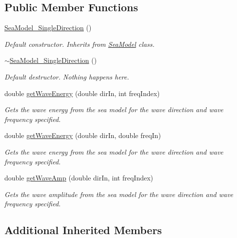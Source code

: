 \subsection*{Public Member Functions}
\begin{DoxyCompactItemize}
\item 
\hyperlink{classosea_1_1_sea_model___single_direction_a6af167a4b5c05a0d1764e3172977c5fa}{Sea\-Model\-\_\-\-Single\-Direction} ()
\begin{DoxyCompactList}\small\item\em Default constructor. Inherits from \hyperlink{classosea_1_1_sea_model}{Sea\-Model} class. \end{DoxyCompactList}\item 
\hyperlink{classosea_1_1_sea_model___single_direction_a3c360d846888f7f964cee4fb66875eaa}{$\sim$\-Sea\-Model\-\_\-\-Single\-Direction} ()
\begin{DoxyCompactList}\small\item\em Default destructor. Nothing happens here. \end{DoxyCompactList}\item 
double \hyperlink{classosea_1_1_sea_model___single_direction_af4d5b777a837ba6714f89c818a65f983}{get\-Wave\-Energy} (double dir\-In, int freq\-Index)
\begin{DoxyCompactList}\small\item\em Gets the wave energy from the sea model for the wave direction and wave frequency specified. \end{DoxyCompactList}\item 
double \hyperlink{classosea_1_1_sea_model___single_direction_ad3fd0108026c7faf7dd341e44744766c}{get\-Wave\-Energy} (double dir\-In, double freq\-In)
\begin{DoxyCompactList}\small\item\em Gets the wave energy from the sea model for the wave direction and wave frequency specified. \end{DoxyCompactList}\item 
double \hyperlink{classosea_1_1_sea_model___single_direction_a05bd44e475075521623820407f09e16e}{get\-Wave\-Amp} (double dir\-In, int freq\-Index)
\begin{DoxyCompactList}\small\item\em Gets the wave amplitude from the sea model for the wave direction and wave frequency specified. \end{DoxyCompactList}\end{DoxyCompactItemize}
\subsection*{Additional Inherited Members}


